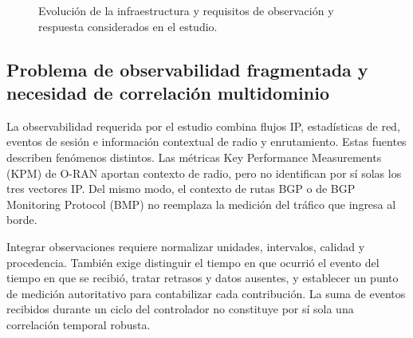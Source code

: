 \begin{figure}[H]
    \centering
    \caption{Evolución de la infraestructura y requisitos de observación y respuesta considerados en el estudio.}
    \label{fig:evolucion_red_amenaza}
\end{figure}

\subsection{Problema de observabilidad fragmentada y necesidad de correlación multidominio}

La observabilidad requerida por el estudio combina flujos IP, estadísticas de red, eventos de sesión e información contextual de radio y enrutamiento. Estas fuentes describen fenómenos distintos. Las métricas Key Performance Measurements (KPM) de O-RAN aportan contexto de radio, pero no identifican por sí solas los tres vectores IP. Del mismo modo, el contexto de rutas BGP o de BGP Monitoring Protocol (BMP) no reemplaza la medición del tráfico que ingresa al borde.

Integrar observaciones requiere normalizar unidades, intervalos, calidad y procedencia. También exige distinguir el tiempo en que ocurrió el evento del tiempo en que se recibió, tratar retrasos y datos ausentes, y establecer un punto de medición autoritativo para contabilizar cada contribución. La suma de eventos recibidos durante un ciclo del controlador no constituye por sí sola una correlación temporal robusta.

